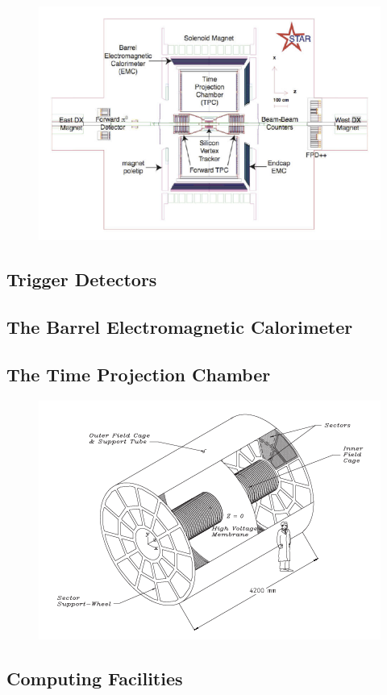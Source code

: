 \cite{Ackermann:2002ad} %

\begin{figure}
  \includegraphics[width=1.0\textwidth]{figures/star-schematic}
  \caption{}
  \label{fig:star-schematic}
\end{figure}

\subsection{Trigger Detectors}

\subsection{The Barrel Electromagnetic Calorimeter}

\cite{Beddo:2002zx} %

\subsection{The Time Projection Chamber}

\cite{Anderson:2003ur} %

\begin{figure}
  \includegraphics[width=1.0\textwidth]{figures/tpc}
  \caption{}
  \label{fig:tpc}
\end{figure}

\subsection{Computing Facilities}
